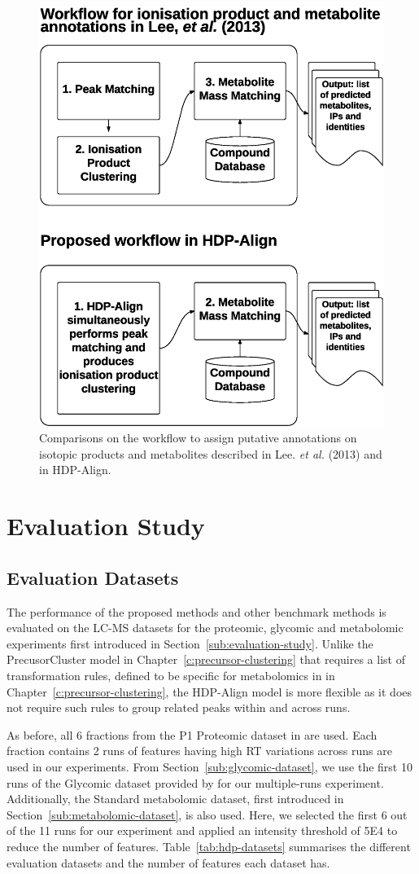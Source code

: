 \begin{figure}[!htbp]
\centering\includegraphics[width=0.5\linewidth]{06-hdp/figures/figure_3.eps}
\centering\caption{Comparisons on the workflow to assign putative annotations on isotopic products and metabolites described in Lee. \textit{et al.} (2013) \cite{Lee2013} and in HDP-Align.\label{fig-workflow}}
\end{figure}

\section{Evaluation Study}

\subsection{Evaluation Datasets}

The performance of the proposed methods and other benchmark methods is evaluated on the LC-MS datasets for the proteomic, glycomic and metabolomic experiments first introduced in Section~\ref{sub:evaluation-study}. Unlike the PrecusorCluster model in Chapter~\ref{c:precursor-clustering} that requires a list of transformation rules, defined to be specific for metabolomics in in Chapter~\ref{c:precursor-clustering}, the HDP-Align model is more flexible as it does not require such rules to group related peaks within and across runs. 

As before, all 6 fractions from the P1 Proteomic dataset in \cite{Lange2008} are used. Each fraction contains 2 runs of features having high \ac{RT} variations across runs are used in our experiments. From Section~\ref{sub:glycomic-dataset}, we use the first 10 runs of the Glycomic dataset provided by \cite{Tsai2013a} for our multiple-runs experiment. Additionally, the Standard metabolomic dataset, first introduced in Section~\ref{sub:metabolomic-dataset}, is also used. Here, we selected the first 6 out of the 11 runs for our experiment and applied an intensity threshold of 5E4 to reduce the number of features. Table~\ref{tab:hdp-datasets} summarises the different evaluation datasets and the number of features each dataset has.

